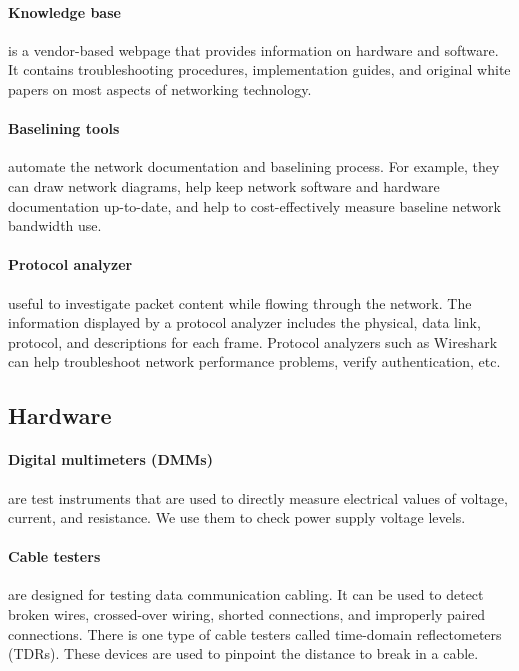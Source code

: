 \paragraph{Knowledge base} is a vendor-based webpage that provides information on hardware and software. It contains troubleshooting procedures, implementation guides, and original white papers on most aspects of networking technology.

\paragraph{Baselining tools}automate  the network documentation and baselining process. For example, they can draw network diagrams, help keep network software and hardware documentation up-to-date, and help to cost-effectively measure baseline network bandwidth use.

\paragraph{Protocol analyzer} useful to investigate packet content while flowing through the network. The information displayed by a protocol analyzer includes the physical, data link, protocol, and descriptions for each frame. Protocol analyzers such as Wireshark can help troubleshoot network performance problems, verify authentication, etc.

\subsection{Hardware}

\paragraph{Digital multimeters (DMMs)}are test instruments that are used to directly measure electrical values of voltage, current, and resistance. We use them to check power supply voltage levels. 

\paragraph{Cable testers} are designed for testing data communication cabling. It can be used to detect broken wires, crossed-over wiring, shorted connections, and improperly paired connections. There is one type of cable testers called time-domain reflectometers (TDRs). These devices are used to pinpoint the distance to break in a cable.

